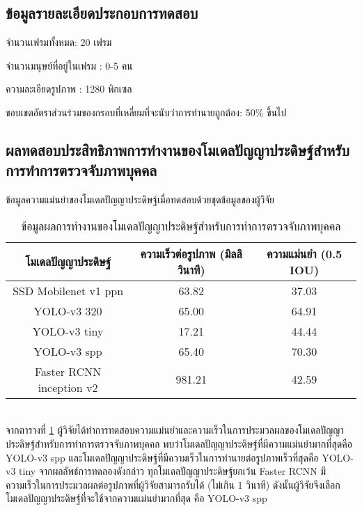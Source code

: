 \subsection{ข้อมูลรายละเอียดประกอบการทดสอบ}
จำนวนเฟรมทั้งหมด: 20 เฟรม

จำนวนมนุษย์ที่อยู่ในเฟรม : 0-5 คน

ความละเอียดรูปภาพ : 1280 พิกเซล

ขอบเขตอัตราส่วนร่วมของกรอบที่เหลี่ยมที่จะนับว่าการทำนายถูกต้อง: 50\% ขึ้นไป


\subsection{ผลทดสอบประสิทธิภาพการทำงานของโมเดลปัญญาประดิษฐ์สำหรับการทำการตรวจจับภาพบุคคล}

ข้อมูลความแม่นยำของโมเดลปัญญาประดิษฐ์เมื่อทดสอบด้วยชุดข้อมูลของผู้วิจัย
\begin{table}[!ht]
	\centering
	\begin{tabular}{|c|c|c|}
			\hline 
			{โมเดลปัญญาประดิษฐ์}&{ความเร็วต่อรูปภาพ (มิลลิวินาที)}&{ความแม่นยำ (0.5 IOU)}			\\
			\hline
			SSD Mobilenet v1 ppn	 					& 63.82 		& 37.03			\\
			YOLO-v3 320							& 65.00		& 64.91		\\
			YOLO-v3 tiny							& 17.21		& 44.44			\\
			YOLO-v3 spp							& 65.40		& 70.30			\\	
			Faster RCNN inception v2					& 981.21		& 42.59		\\
		\hline
	\end{tabular}
	\caption{ข้อมูลผลการทำงานของโมเดลปัญญาประดิษฐ์สำหรับการทำการตรวจจับภาพบุคคล}
    \label{tab:origina_detectEx}
\end{table}
\\
จากตารางที่ \ref{tab:origina_detectEx} ผู้วิจัยได้ทำการทดสอบความแม่นยำและความเร็วในการประมวลผลของโมเดลปัญญาประดิษฐ์สำหรับการทำการตรวจจับภาพบุคคล 
พบว่าโมเดลปัญญาประดิษฐ์ที่มีความแม่นยำมากที่สุดคือ YOLO-v3 spp และโมเดลปัญญาประดิษฐ์ที่มีความเร็วในการทำนายต่อรูปภาพเร็วที่สุดคือ YOLO-v3 tiny จากผลลัพธ์การทดลองดังกล่าว 
ทุกโมเดลปัญญาประดิษฐ์ยกเว้น Faster RCNN มีความเร็วในการประมวลผลต่อรูปภาพที่ผู้วิจัยสามารถรับได้ (ไม่เกิน 1 วินาที) 
ดังนั้นผู้วิจัยจึงเลือกโมเดลปัญญาประดิษฐ์ที่จะใช้จากความแม่นยำมากที่สุด คือ YOLO-v3 spp